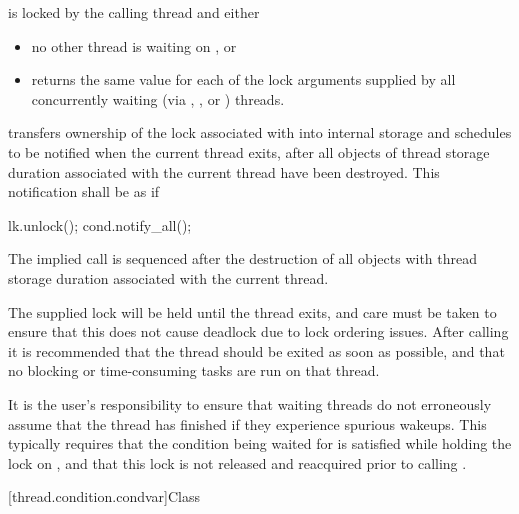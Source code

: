 \begin{itemdescr}
\pnum
\requires {} is locked by the calling thread and either

\begin{itemize}
\item no other thread is waiting on , or
\item {} returns the same value for each of the lock arguments
supplied by all concurrently waiting (via , ,
or ) threads.
\end{itemize}

\pnum
\effects transfers ownership of the lock associated with  into
internal storage and schedules  to be notified when the current
thread exits, after all objects of thread storage duration associated with
the current thread have been destroyed. This notification shall be as if
\begin{codeblock}
lk.unlock();
cond.notify_all();
\end{codeblock}

\pnum
\sync The implied  call is sequenced after the destruction of
all objects with thread storage duration associated with the current thread.

\pnum
\realnote The supplied lock will be held until the thread exits, and care
must be taken to ensure that this does not cause deadlock due to lock
ordering issues. After calling  it is
recommended that the thread should be exited as soon as possible, and
that no blocking or time-consuming tasks are run on that thread.

\pnum
\realnote It is the user's responsibility to ensure that waiting threads
do not erroneously assume that the thread has finished if they experience
spurious wakeups. This typically requires that the condition being waited
for is satisfied while holding the lock on , and that this lock
is not released and reacquired prior to calling .
\end{itemdescr}

[thread.condition.condvar]{Class }

